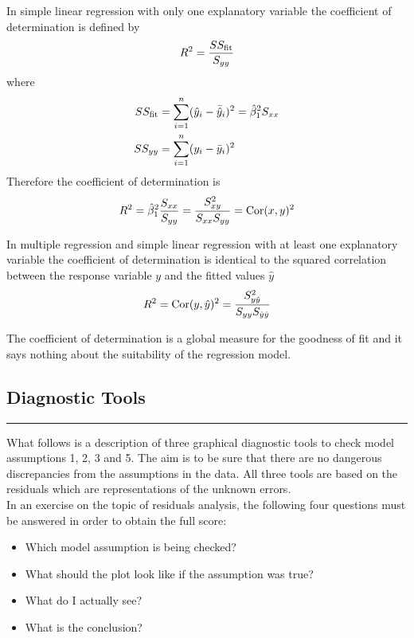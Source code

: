 In simple linear regression with only one explanatory variable the coefficient of determination is defined by
\begin{equation}
  R^2 = \frac{SS_{\textup{fit}}}{S_{yy}}
\end{equation}
where
\begin{equation}
  \begin{split}
    SS_{\textup{fit}} &= \sum_{i=1}^n(\hat{y}_i - \bar{\hat{y}}_i)^2 = \hat{\beta}_1^2 S_{xx}\\
    SS_{yy} &= \sum_{i=1}^n(y_i - \bar{y}_i)^2
  \end{split}
\end{equation}
Therefore the coefficient of determination is
\begin{equation}
  R^2 = \hat{\beta}_1^2 \frac{S_{xx}}{S_{yy}} = \frac{S_{xy}^2}{S_{xx} S_{yy}} = \textup{Cor}(x, y)^2
\end{equation}

In multiple regression and simple linear regression with at least one explanatory variable the coefficient of determination is identical to the squared correlation between the response variable $y$ and the fitted values $\hat{y}$
\begin{equation}
  R^2 = \textup{Cor}(y, \hat{y})^2 = \frac{S_{y\hat{y}}^2}{S_{yy} S_{\hat{y}\hat{y}}}
\end{equation}

The coefficient of determination is a global measure for the goodness of fit and it says nothing about the suitability of the regression model.

\subsection{Diagnostic Tools}
\noindent\rule[\linienAbstand]{\linewidth}{\linienDicke}
What follows is a description of three graphical diagnostic tools to check model assumptions 1, 2, 3 and 5. The aim is to be sure that there are no dangerous discrepancies from the assumptions in the data. All three tools are based on the residuals which are representations of the unknown errors.\\
In an exercise on the topic of residuals analysis, the following four questions must be answered in order to obtain the full score:
\begin{itemize}
  \item Which model assumption is being checked?
  \item What should the plot look like if the assumption was true?
  \item What do I actually see?
  \item What is the conclusion?
\end{itemize}

